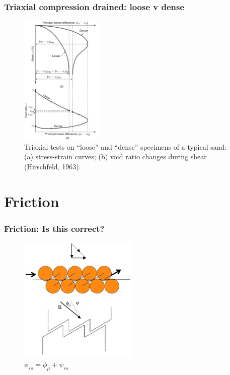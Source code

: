 \documentclass[notes]{beamer}
\begin{document}
\begin{frame}
\frametitle{Triaxial compression drained: loose v dense}
\begin{figure}
	\includegraphics[width=0.35\textwidth]{figs/tx-drained-loose-dense.png}
	\caption*{Triaxial tests on “loose” and “dense” specimens of a typical sand: (a) stress-strain curves; (b) void
		ratio changes during shear (Hirschfeld, 1963).}
\end{figure}
\end{frame}

\section{Friction}
\begin{frame}
\frametitle{Friction: Is this correct?}
\begin{figure}
	\includegraphics[width=0.5\textwidth]{figs/friction-sawblade.png}
	\caption*{$\phi_{ss} = \phi_\mu + \psi_{ss}$}
\end{figure}
\end{frame}
\end{document}
